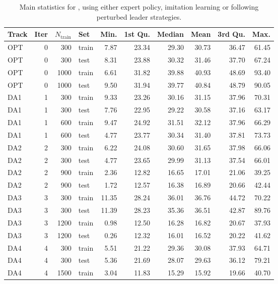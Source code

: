 \begin{table}[ht]
\caption{Main statistics for  \namerho, using either expert
   policy, imitation learning or following perturbed leader 
   strategies.}\label{tbl:il:stats} 
\centering
\begin{tabular}{lrrlrrrrrr}
  \toprule
  Track & Iter & $N_{\text{train}}$ & Set & Min. & 1st Qu. & Median & Mean & 
  3rd Qu. & Max. \\ 
  \midrule
  OPT & 0 & 300 & train & 7.87 & 23.34 & 29.30 & 30.73 & 36.47 & 61.45 \\ 
  OPT & 0 & 300 & test & 8.31 & 23.88 & 30.32 & 31.46 & 37.70 & 67.24 \\ 
  OPT & 0 & 1000 & train & 6.61 & 31.82 & 39.88 & 40.93 & 48.69 & 93.40 \\ 
  OPT & 0 & 1000 & test & 9.50 & 31.94 & 39.77 & 40.84 & 48.79 & 90.05 \\ 
  DA1 & 1 & 300 & train & 9.33 & 23.26 & 30.16 & 31.15 & 37.96 & 70.31 \\ 
  DA1 & 1 & 300 & test & 7.76 & 22.95 & 29.22 & 30.58 & 37.16 & 63.17 \\ 
  DA1 & 1 & 600 & train & 9.47 & 24.92 & 31.51 & 32.12 & 37.96 & 66.29 \\ 
  DA1 & 1 & 600 & test & 4.77 & 23.77 & 30.34 & 31.40 & 37.81 & 73.73 \\ 
  DA2 & 2 & 300 & train & 6.22 & 24.08 & 30.60 & 31.65 & 37.98 & 66.06 \\ 
  DA2 & 2 & 300 & test & 4.77 & 23.65 & 29.99 & 31.13 & 37.54 & 66.01 \\ 
  DA2 & 2 & 900 & train & 2.36 & 12.82 & 16.65 & 17.01 & 21.06 & 39.25 \\ 
  DA2 & 2 & 900 & test & 1.72 & 12.57 & 16.38 & 16.89 & 20.66 & 42.44 \\ 
  DA3 & 3 & 300 & train & 11.35 & 28.24 & 36.01 & 36.76 & 44.72 & 70.22 \\ 
  DA3 & 3 & 300 & test & 11.39 & 28.23 & 35.36 & 36.51 & 42.87 & 89.76 \\ 
  DA3 & 3 & 1200 & train & 0.98 & 12.50 & 16.28 & 16.82 & 20.67 & 37.93 \\ 
  DA3 & 3 & 1200 & test & 0.26 & 12.32 & 16.01 & 16.52 & 20.22 & 41.62 \\ 
  DA4 & 4 & 300 & train & 5.51 & 21.22 & 29.36 & 30.08 & 37.93 & 64.71 \\ 
  DA4 & 4 & 300 & test & 5.36 & 21.69 & 28.07 & 29.63 & 36.12 & 79.21 \\ 
  DA4 & 4 & 1500 & train & 3.04 & 11.83 & 15.29 & 15.92 & 19.66 & 40.70 \\ 

\end{tabular}
\end{table}

